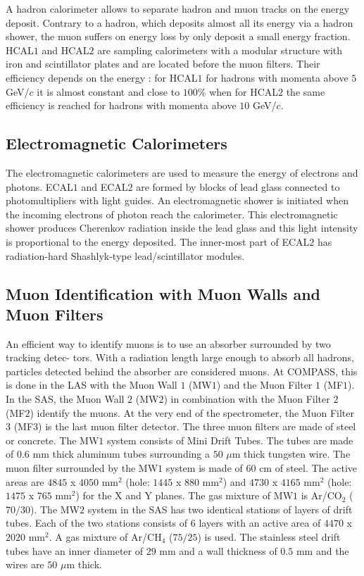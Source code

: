 A hadron calorimeter allows to separate hadron and muon tracks on the energy deposit. Contrary to a hadron, which deposits almost all its energy via a hadron shower, the muon suffers on energy loss by only deposit a small energy fraction. HCAL$1$ and HCAL$2$ are sampling calorimeters with a modular structure with iron and scintillator plates and are located before the muon filters. Their efficiency depends on the energy : for HCAL$1$ for hadrons with momenta above $5$ GeV/$c$ it is almost constant and close to $100$\% when for HCAL$2$ the same efficiency is reached for hadrons with momenta above $10$ GeV/$c$.

\subsection{Electromagnetic Calorimeters}

The electromagnetic calorimeters are used to measure the energy of electrons and photons. ECAL$1$ and ECAL$2$ are formed by blocks of lead glass connected to photomultipliers with light guides. An electromagnetic shower is initiated when the incoming electrons of photon reach the calorimeter. This electromagnetic shower produces Cherenkov radiation inside the lead glass and this light intensity is proportional to the energy deposited. The inner-most part of ECAL$2$ has radiation-hard Shashlyk-type lead/scintillator modules.

\subsection{Muon Identification with Muon Walls and Muon Filters}

An efficient way to identify muons is to use an absorber surrounded by two tracking detec- tors. With a radiation length large enough to absorb all hadrons, particles detected behind the absorber are considered muons. At COMPASS, this is done in the LAS with the Muon Wall $1$ (MW$1$) and the Muon Filter $1$ (MF$1$). In the SAS, the Muon Wall $2$ (MW$2$) in combination with the Muon Filter $2$ (MF$2$) identify the muons. At the very end of the spectrometer, the Muon Filter $3$ (MF$3$) is the last muon filter detector. The three muon filters are made of steel or concrete. The MW$1$ system consists of Mini Drift Tubes. The tubes are made of $0.6$ mm thick aluminum tubes surrounding a $50$ $\mu$m thick tungsten wire. The muon filter surrounded by the MW$1$ system is made of $60$ cm of steel. The active areas are $4845$ x $4050$ mm$^2$ (hole: $1445$ x $880$ mm$^2$) and $4730$ x $4165$ mm$^2$ (hole: $1475$ x $765$ mm$^2$) for the X and Y planes. The gas mixture of MW$1$ is Ar/CO$_2$ ($70/30$). The MW$2$ system in the SAS has two identical stations of layers of drift tubes. Each of the two stations consists of $6$ layers with an active area of $4470$ x $2020$ mm$^2$. A gas mixture of Ar/CH$_4$ ($75/25$) is used. The stainless steel drift tubes have an inner diameter of $29$ mm and a wall thickness of $0.5$ mm and the wires are $50$ $\mu$m thick.

